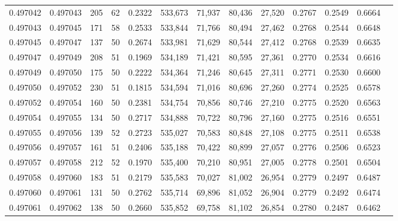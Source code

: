 \begin{tabular}{rrrrrrrrrrrrr}
0.497042 & 0.497043 &   205 &  62 &                                     0.2322 & 533,673 &  71,937 &  80,436 &  27,520 & 0.2767 & 0.2549 & 0.6664 \\
0.497043 & 0.497045 &   171 &  58 &                                     0.2533 & 533,844 &  71,766 &  80,494 &  27,462 & 0.2768 & 0.2544 & 0.6648 \\
0.497045 & 0.497047 &   137 &  50 &                                     0.2674 & 533,981 &  71,629 &  80,544 &  27,412 & 0.2768 & 0.2539 & 0.6635 \\
0.497047 & 0.497049 &   208 &  51 &                                     0.1969 & 534,189 &  71,421 &  80,595 &  27,361 & 0.2770 & 0.2534 & 0.6616 \\
0.497049 & 0.497050 &   175 &  50 &                                     0.2222 & 534,364 &  71,246 &  80,645 &  27,311 & 0.2771 & 0.2530 & 0.6600 \\
0.497050 & 0.497052 &   230 &  51 &                                     0.1815 & 534,594 &  71,016 &  80,696 &  27,260 & 0.2774 & 0.2525 & 0.6578 \\
0.497052 & 0.497054 &   160 &  50 &                                     0.2381 & 534,754 &  70,856 &  80,746 &  27,210 & 0.2775 & 0.2520 & 0.6563 \\
0.497054 & 0.497055 &   134 &  50 &                                     0.2717 & 534,888 &  70,722 &  80,796 &  27,160 & 0.2775 & 0.2516 & 0.6551 \\
0.497055 & 0.497056 &   139 &  52 &                                     0.2723 & 535,027 &  70,583 &  80,848 &  27,108 & 0.2775 & 0.2511 & 0.6538 \\
0.497056 & 0.497057 &   161 &  51 &                                     0.2406 & 535,188 &  70,422 &  80,899 &  27,057 & 0.2776 & 0.2506 & 0.6523 \\
0.497057 & 0.497058 &   212 &  52 &                                     0.1970 & 535,400 &  70,210 &  80,951 &  27,005 & 0.2778 & 0.2501 & 0.6504 \\
0.497058 & 0.497060 &   183 &  51 &                                     0.2179 & 535,583 &  70,027 &  81,002 &  26,954 & 0.2779 & 0.2497 & 0.6487 \\
0.497060 & 0.497061 &   131 &  50 &                                     0.2762 & 535,714 &  69,896 &  81,052 &  26,904 & 0.2779 & 0.2492 & 0.6474 \\
0.497061 & 0.497062 &   138 &  50 &                                     0.2660 & 535,852 &  69,758 &  81,102 &  26,854 & 0.2780 & 0.2487 & 0.6462 \\

\end{tabular}
